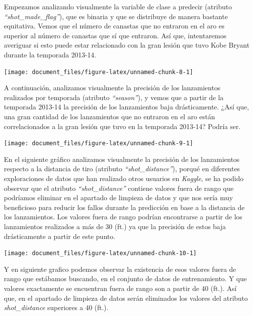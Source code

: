 \documentclass[
]{article}
\begin{document}
Empezamos analizando visualmente la variable de clase a predecir
(atributo \emph{``shot\_made\_flag''}), que es binaria y que se
distribuye de manera bastante equitativa. Vemos que el número de
canastas que no entraron en el aro es superior al número de canastas que
sí que entraron. Así que, intentaremos averiguar si esto puede estar
relacionado con la gran lesión que tuvo Kobe Bryant durante la temporada
2013-14.

\begin{center}\texttt{[image: document\_files/figure-latex/unnamed-chunk-8-1]} \end{center}

A continuación, analizamos visualmente la precisión de los lanzamientos
realizados por temporada (atributo \emph{``season''}), y vemos que a
partir de la temporada 2013-14 la precisión de los lanzamientos baja
drásticamente. ¿Así que, una gran cantidad de los lanzamientos que no
entraron en el aro están correlacionados a la gran lesión que tuvo en la
temporada 2013-14? Podría ser.

\begin{center}\texttt{[image: document\_files/figure-latex/unnamed-chunk-9-1]} \end{center}

En el siguiente gráfico analizamos visualmente la precisión de los
lanzamientos respecto a la distancia de tiro (atributo
\emph{``shot\_distance''}), porqué en diferentes exploraciones de datos
que han realizado otros usuarios en \emph{Kaggle}, se ha podido observar
que el atributo \emph{``shot\_distance''} contiene valores fuera de
rango que podríamos eliminar en el apartado de limpieza de datos y que
nos sería muy beneficioso para reducir los fallos durante la predicción
en base a la distancia de los lanzamientos. Los valores fuera de rango
podrían encontrarse a partir de los lanzamientos realizados a más de 30
(ft.) ya que la precisión de estos baja drásticamente a partir de este
punto.

\begin{center}\texttt{[image: document\_files/figure-latex/unnamed-chunk-10-1]} \end{center}

Y en siguiente grafico podemos observar la existencia de esos valores
fuera de rango que estábamos buscando, en el conjunto de datos de
entrenamiento. Y que valores exactamente se encuentran fuera de rango
son a partir de 40 (ft.). Así que, en el apartado de limpieza de datos
serán eliminados los valores del atributo \emph{shot\_distance}
superiores a 40 (ft.).
\end{document}
